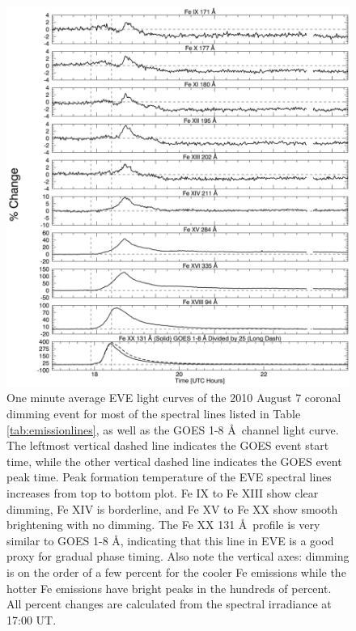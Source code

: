 \newpage
\begin{singlespace}
\begin{figure}[H]
    \begin{center}
	    \includegraphics[width=166mm]{Images/Eve2010Aug7.png}
    \end{center}
    \caption[EVE selected extracted emission lines for 2010 August 7 event]{ 
        One minute average EVE light curves of the 2010 August 7 coronal dimming event for most of the spectral lines listed 
        in Table \ref{tab:emissionlines}, as well as the GOES 1-8 \AA\ channel light curve. The leftmost vertical dashed 
        line indicates
        the GOES event start time, while the other vertical dashed line indicates the GOES event peak time. Peak formation 
        temperature of the EVE spectral lines increases from top to bottom plot. Fe IX to Fe XIII show clear dimming, Fe XIV
        is borderline, and Fe XV to Fe XX show smooth brightening with no dimming. The Fe XX 131 \AA\ profile is very 
        similar to GOES 1-8 \AA, indicating that this line in EVE is a good proxy for gradual phase timing. Also note the 
        vertical axes: dimming is on the order of a few percent for the cooler Fe emissions while the hotter Fe emissions 
        have bright peaks in the hundreds of percent. All percent changes are calculated from the spectral irradiance at 
        17:00 UT.
    }
    \label{eve2010aug7}
\end{figure}
\end{singlespace}

